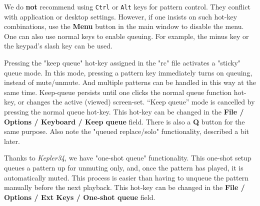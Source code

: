    We do \textbf{not}
   recommend using \texttt{Ctrl} or \texttt{Alt}
   keys for pattern control.  They conflict with application or desktop
   settings.  However, if one insists on such hot-key combinations,
   use the \textbf{Menu} button in the main
   window to disable the menu.
   One can also use normal keys to enable queuing.
   For example, the minus key or the keypad's slash key can be used.

   Pressing the "keep queue" hot-key
   assigned in the "rc" file activates a "sticky" queue mode.
   In this mode, pressing a pattern key immediately turns on queuing, instead
   of mute/unmute.  And multiple patterns can be handled in this way at the
   same time.
   Keep-queue persists until one clicks the normal queue function hot-key,
   or changes the active (viewed) screen-set. 
   “Keep queue” mode is cancelled by pressing the normal queue hot-key.
   This hot-key can be changed in the
   \textbf{File / Options / Keyboard / Keep queue} field.
   There is also a \textbf{Q} button for the same purpose.
   Also note the "queued replace/solo" functionality, described a bit later.

   Thanks to \textsl{Kepler34}, we have "one-shot queue"
   functionality.  This one-shot setup queues a pattern up for unmuting only,
   and, once the pattern has played, it is automatically muted.  This process
   is easier than having to unqueue the pattern manually before the next
   playback.
   This hot-key can be changed in the
   \textbf{File / Options / Ext Keys / One-shot queue} field.

